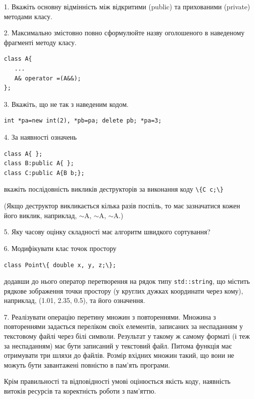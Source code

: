 \documentclass[12pt, ukrainian]{article}
\def\code#1{\Verb!#1!}
\begin{document}
{%
1. Вкажіть основну відмінність між відкритими (public) та прихованими (private) методами класу.%
\par
\vspace{2mm}
2. Максимально змістовно повно сформулюйте назву оголошеного в наведеному фрагменті методу класу.
\vspace{-3mm}
\begin{verbatim}class A{
   ...
   A& operator =(A&&);
};\end{verbatim}
\vspace{-3mm}
\par
\vspace{2mm}
3. Вкажіть, що не так з наведеним кодом.
\vspace{-3mm}
\begin{verbatim}int *pa=new int(2), *pb=pa; delete pb; *pa=3;\end{verbatim}
\vspace{-3mm}
\par
\vspace{2mm}
4. За наявності означень
\vspace{-3mm}
\begin{verbatim}
class A{ };
class B:public A{ };
class C:public A{B b;};\end{verbatim}
\vspace{-3mm}
вкажіть послідовність викликів деструкторів за виконання коду \code{\{C c;\}} 

(Якщо деструктор викликається кілька разів поспіль, то має зазначатися кожен його виклик, наприклад, $\sim$A, $\sim$A, $\sim$A.)

\vspace{2mm}
5. Яку часову оцінку складності має алгоритм швидкого сортування?
\par
\vspace{2mm}
6. Модифікувати клас точок простору 

\qquad\code{class Point\{ double x, y, z;\};}


додавши до нього оператор перетворення на рядок типу \code{std::string}, що містить рядкове зображення точки простору (у круглих дужках координати через кому), наприклад, (1.01, 2.35, 0.5), та його означення.%
\par
\vspace{2mm}
7. 
Реалізувати операцію перетину множин з повтореннями. Множина з повтореннями задається переліком своїх елементів, записаних за неспаданням у текстовому файлі через білі символи. Результат у такому ж самому форматі (і теж за неспаданням) має бути записаний у текстовий файл. Питома функція має отримувати три шляхи до файлів. Розмір вхідних множин такий, що вони не можуть бути завантажені повністю в пам’ять програми.

Крім правильності та відповідності умові оцінюється якість коду, наявність витоків ресурсів та коректність роботи з пам'яттю. 

}
\end{document}
